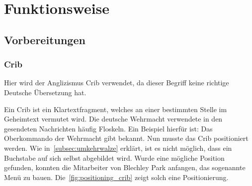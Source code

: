 \newpage

\section{Funktionsweise}\label{sec:funktionsweise_bombe}

\subsection{Vorbereitungen}\label{subsec:vorbereitungen}

\subsubsection{Crib}\label{subsubsec:crib}
Hier wird der Anglizismus \glqq Crib\grqq{} verwendet, da dieser Begriff keine richtige Deutsche Übersetzung hat.

Ein Crib ist ein Klartextfragment, welches an einer bestimmten Stelle im Geheimtext vermutet wird. 
Die deutsche Wehrmacht verwendete in den gesendeten Nachrichten häufig Floskeln. 
Ein Beispiel hierfür ist: \glqq Das Oberkommando der Wehrmacht gibt bekannt\grqq.
Nun musste das Crib positioniert werden.
Wie in~\cref{subsec:umkehrwalze} erklärt, ist es nicht möglich, dass ein Buchstabe auf sich selbst abgebildet wird.
Wurde eine mögliche Position gefunden, konnten die Mitarbeiter von Blechley Park anfangen, das sogenannte Menü zu bauen.
Die~\cref{fig:positioning_crib} zeigt solch eine Positionierung.

